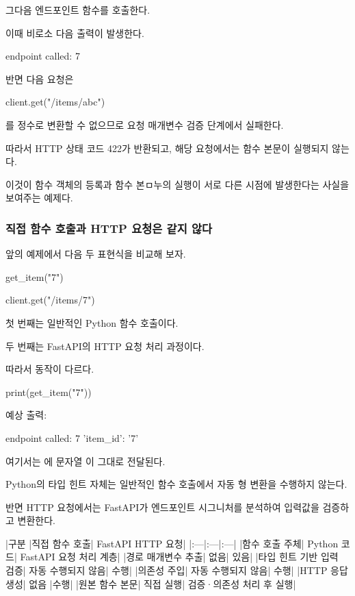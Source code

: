 그다음 엔드포인트 함수를 호출한다.

이때 비로소 다음 출력이 발생한다.

\begin{dhkzsh}
endpoint called: 7
\end{dhkzsh}

반면 다음 요청은

\begin{dhkcode}
client.get("/items/abc")
\end{dhkcode}

를 정수로 변환할 수 없으므로 요청 매개변수 검증 단계에서 실패한다.

따라서 HTTP 상태 코드 422가 반환되고, 해당 요청에서는  함수 본문이 실행되지 않는다.

이것이 함수 객체의 등록과 함수 본ㅁ누의 실행이 서로 다른 시점에 발생한다는 사실을 보여주는 예제다.

\subsubsection{직접 함수 호출과 HTTP 요청은 같지 않다}

앞의 예제에서 다음 두 표현식을 비교해 보자.

\begin{dhkcode}
get_item("7")

client.get("/items/7")
\end{dhkcode}

첫 번째는 일반적인 Python 함수 호출이다.

두 번째는 FastAPI의 HTTP 요청 처리 과정이다.

따라서 동작이 다르다.

\begin{dhkcode}
print(get_item("7"))
\end{dhkcode}

예상 출력:

\begin{dhkzsh}
endpoint called: 7
{'item_id': '7'}
\end{dhkzsh}

여기서는 에 문자열 이 그대로 전달된다.

Python의 타입 힌트  자체는 일반적인 함수 호출에서 자동 형 변환을 수행하지 않는다.

반면 HTTP 요청에서는 FastAPI가 엔드포인트 시그니처를 분석하여 입력값을 검증하고 변환한다.

\begin{dhktable}
|구분	|직접 함수 호출|	FastAPI HTTP 요청|
|:---|:---|:---|
|함수 호출 주체|	Python 코드|	FastAPI 요청 처리 계층|
|경로 매개변수 추출|	없음|	있음|
|타입 힌트 기반 입력 검증|	자동 수행되지 않음|	수행|
|의존성 주입|	자동 수행되지 않음|	수행|
|HTTP 응답 생성|	없음	|수행|
|원본 함수 본문|	직접 실행|	검증·의존성 처리 후 실행|
\end{dhktable}


